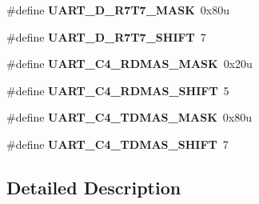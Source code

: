 \begin{DoxyCompactItemize}
\#define {\bfseries U\+A\+R\+T\+\_\+\+D\+\_\+\+R7\+T7\+\_\+\+M\+A\+SK}~0x80u
\item 
\mbox{\label{group___u_a_r_t___register___masks_gad2b538e10e336537f0adf3c63317bc69}} 
\#define {\bfseries U\+A\+R\+T\+\_\+\+D\+\_\+\+R7\+T7\+\_\+\+S\+H\+I\+FT}~7
\item 
\mbox{\label{group___u_a_r_t___register___masks_ga51946763b696d9d65cc421b08995923a}} 
\#define {\bfseries U\+A\+R\+T\+\_\+\+C4\+\_\+\+R\+D\+M\+A\+S\+\_\+\+M\+A\+SK}~0x20u
\item 
\mbox{\label{group___u_a_r_t___register___masks_ga4c44b0d9f3315d9fad52f1c2b9e2d347}} 
\#define {\bfseries U\+A\+R\+T\+\_\+\+C4\+\_\+\+R\+D\+M\+A\+S\+\_\+\+S\+H\+I\+FT}~5
\item 
\mbox{\label{group___u_a_r_t___register___masks_gaddd38f2fce38e0a363744ab50071c471}} 
\#define {\bfseries U\+A\+R\+T\+\_\+\+C4\+\_\+\+T\+D\+M\+A\+S\+\_\+\+M\+A\+SK}~0x80u
\item 
\mbox{\label{group___u_a_r_t___register___masks_ga60d9c5b3d3d01f52b013c8d22363ff24}} 
\#define {\bfseries U\+A\+R\+T\+\_\+\+C4\+\_\+\+T\+D\+M\+A\+S\+\_\+\+S\+H\+I\+FT}~7
\end{DoxyCompactItemize}


\subsection{Detailed Description}
